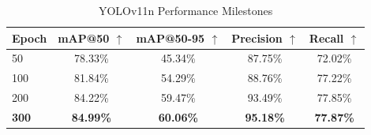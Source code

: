 \documentclass{article}
\begin{document}
\setcounter{table}{2}

\begin{table}[ht]
    \centering
    \caption{YOLOv11n Performance Milestones}
    \label{tab:yolo_performance}
    \begin{tabular}{lcccc}
        \toprule
        \textbf{Epoch} & \textbf{mAP@50} $\uparrow$ & \textbf{mAP@50-95} $\uparrow$ & \textbf{Precision} $\uparrow$ & \textbf{Recall} $\uparrow$ \\
        \midrule
        50  & 78.33\% & 45.34\% & 87.75\% & 72.02\% \\
        100 & 81.84\% & 54.29\% & 88.76\% & 77.22\% \\
        200 & 84.22\% & 59.47\% & 93.49\% & 77.85\% \\
        \textbf{300} & \textbf{84.99\%} & \textbf{60.06\%} & \textbf{95.18\%} & \textbf{77.87\%} \\
        \bottomrule
    \end{tabular}
\end{table}
\end{document}
